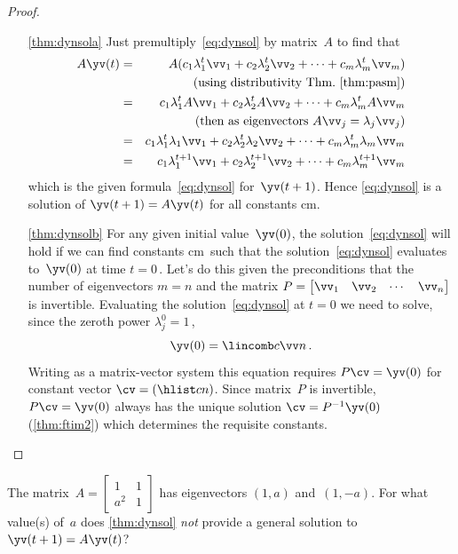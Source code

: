 \begin{proof} \ 
\begin{itemize}
\item[\ref{thm:dynsola}] 
Just premultiply~\eqref{eq:dynsol} by matrix~\(A\) to find that
\begin{eqnarray*}
A\yv(t)&=&A(c_1\lambda_1^t\vv_1+c_2\lambda_2^t\vv_2+\cdots+c_m\lambda_m^t\vv_m)
\\&&\quad(\text{using distributivity Thm.~\ref{thm:pasm}})
\\&=&c_1\lambda_1^tA\vv_1+c_2\lambda_2^tA\vv_2+\cdots+c_m\lambda_m^tA\vv_m
\\&&\quad(\text{then as eigenvectors }A\vv_j=\lambda_j\vv_j)
\\&=&c_1\lambda_1^t\lambda_1\vv_1+c_2\lambda_2^t\lambda_2\vv_2+\cdots+c_m\lambda_m^t\lambda_m\vv_m
\\&=&c_1\lambda_1^{t+1}\vv_1+c_2\lambda_2^{t+1}\vv_2+\cdots+c_m\lambda_m^{t+1}\vv_m
\end{eqnarray*}
which is the given formula~\eqref{eq:dynsol} for~\(\yv(t+1)\).
Hence \eqref{eq:dynsol} is a solution of \(\yv(t+1)=A\yv(t)\) for all constants \hlist cm.

\item[\ref{thm:dynsolb}]
For any given initial value~\(\yv(0)\), the solution~\eqref{eq:dynsol} will hold if we can find constants \hlist cm\ such that the solution~\eqref{eq:dynsol} evaluates to~\(\yv(0)\) at time \(t=0\)\,.
Let's do this given the preconditions that the number of eigenvectors \(m=n\) and the matrix \(P=\begin{bmatrix} \vv_1&\vv_2&\cdots&\vv_n \end{bmatrix}\) is {invertible}.
Evaluating the solution~\eqref{eq:dynsol} at \(t=0\) we need to solve, since the zeroth power \(\lambda_j^0=1\)\,,
\begin{equation*}
\yv(0)=\lincomb c\vv n\,.
\end{equation*}
Writing as a matrix-vector system this equation requires \(P\cv=\yv(0)\) for constant vector \(\cv=(\hlist cn)\).
Since matrix~\(P\) is invertible, \(P\cv=\yv(0)\) always has the unique solution \(\cv=P^{-1}\yv(0)\) (\autoref{thm:ftim2}) which determines the requisite constants.
\end{itemize}
\end{proof}




\begin{activity}
The matrix~\(A=\begin{bmatrix} 1&1\\a^2&1 \end{bmatrix}\) has eigenvectors \((1,a)\) and~\((1,-a)\).
For what value(s) of~\(a\) does \autoref{thm:dynsol} \emph{not} provide a general solution to \(\yv(t+1)=A\yv(t)\)?
\actposs[4]{\(a=0\)}{\(a=-1\)}{\(a=1\)}{\(a=\pm1\)}
\end{activity}




